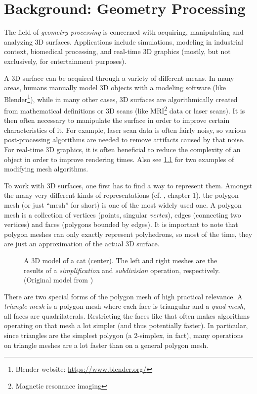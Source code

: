 \chapter{Background: Geometry Processing}

The field of \emph{geometry processing} is concerned with acquiring, manipulating and analyzing 3D surfaces.
Applications include simulations, modeling in industrial context, biomedical processing, and real-time 3D graphics (mostly, but not exclusively, for entertainment purposes).

A 3D surface can be acquired through a variety of different means.
In many areas, humans manually model 3D objects with a modeling software (like Blender\footnote{Blender website: \url{https://www.blender.org/}}), while in many other cases, 3D surfaces are algorithmically created from mathematical definitions or 3D scans (like MRI\footnote{Magnetic resonance imaging} data or laser scans).
It is then often necessary to manipulate the surface in order to improve certain characteristics of it.
For example, laser scan data is often fairly noisy, so various post-processing algorithms are needed to remove artifacts caused by that noise.
For real-time 3D graphics, it is often beneficial to reduce the complexity of an object in order to improve rendering times.
Also see \ref{fig:cat-algo} for two examples of modifying mesh algorithms.

To work with 3D surfaces, one first has to find a way to represent them.
Amongst the many very different kinds of representations (cf. \cite{botsch2010polygon}, chapter 1), the polygon mesh (or just \enquote{mesh} for short) is one of the most widely used one.
A polygon mesh is a collection of vertices (points, singular \emph{vertex}), edges (connecting two vertices) and faces (polygons bounded by edges).
It is important to note that polygon meshes can only exactly represent polyhedrons, so most of the time, they are just an approximation of the actual 3D surface.

\begin{figure}[b]
  
  \caption{A 3D model of a cat (center).
  The left and right meshes are the results of a \emph{simplification} and \emph{subdivision} operation, respectively.
  (Original model from \cite{catmodel})}
  \label{fig:cat-algo}
\end{figure}

There are two special forms of the polygon mesh of high practical relevance.
A \emph{triangle mesh} is a polygon mesh where each face is triangular and a \emph{quad mesh}, all faces are quadrilaterals.
Restricting the faces like that often makes algorithms operating on that mesh a lot simpler (and thus potentially faster).
In particular, since triangles are the simplest polygon (a 2-simplex, in fact), many operations on triangle meshes are a lot faster than on a general polygon mesh.

